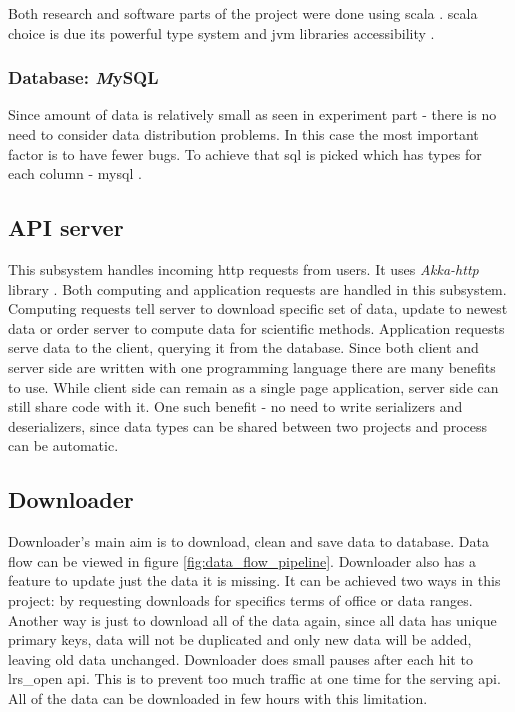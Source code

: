 \documentclass[a4paper,12pt]{article}
\begin{document}
    Both research and software parts of the project were done using \gls{scala} \cite{scala_lang}. \Gls{scala} choice is due its powerful type system and \gls{jvm} libraries accessibility \cite{scala_in_depth}. 
    
    \subsubsection{Database: {\textit MySQL}}
    
  	Since amount of data is relatively small as seen in experiment part - there is no need to consider data distribution problems. In this case the most important factor is to have fewer bugs. To achieve that \acrfull{sql} is picked which has types for each column - \gls{mysql} \cite{mysql_lang}.
    
	\subsection{API server}
	
	This subsystem handles incoming \gls{http} requests from users. It uses \textit{Akka-http} library \cite{akka_http}. Both computing and application requests are handled in this subsystem. Computing requests tell server to download specific set of data, update to newest data or order server to compute data for scientific methods. Application requests serve data to the client, querying it from the database. Since both client and server side are written with one programming language there are many benefits to use. While client side can remain as a single page application, server side can still share code with it. One such benefit - no need to write serializers and deserializers, since data types can be shared between two projects and process can be automatic. 
	
    \subsection{Downloader}
    
    Downloader's main aim is to download, clean and save data to database. Data flow can be viewed in figure \ref{fig:data_flow_pipeline}. Downloader also has a feature to update just the data it is missing. It can be achieved two ways in this project: by requesting downloads for specifics terms of office or data ranges. Another way is just to download all of the data again, since all data has unique primary keys, data will not be duplicated and only new data will be added, leaving old data unchanged. Downloader does small pauses after each hit to \gls{lrs_open} \acrshort{api}. This is to prevent too much traffic at one time for the serving \acrshort{api}. All of the data can be downloaded in few hours with this limitation.
    
\end{document}
